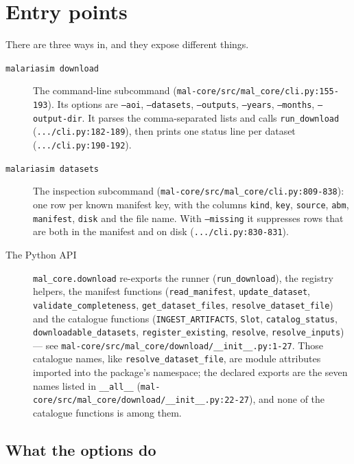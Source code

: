 \documentclass[11pt,a4paper]{article}
\newcommand{\code}[1]{\texttt{#1}}
\begin{document}
\section{Entry points}
\label{sec:entry}

There are three ways in, and they expose different things.

\begin{description}
\item[\code{malariasim download}] The command-line subcommand
(\code{mal-core/src/mal\_core/cli.py:155-193}). Its options are \code{--aoi},
\code{--datasets}, \code{--outputs}, \code{--years}, \code{--months},
\code{--output-dir}. It parses the comma-separated lists and calls
\code{run\_download} (\code{.../cli.py:182-189}), then prints one status line
per dataset (\code{.../cli.py:190-192}).
\item[\code{malariasim datasets}] The inspection subcommand
(\code{mal-core/src/mal\_core/cli.py:809-838}): one row per known manifest
key, with the columns \code{kind}, \code{key}, \code{source}, \code{abm},
\code{manifest}, \code{disk} and the file name. With \code{--missing} it
suppresses rows that are both in the manifest and on disk
(\code{.../cli.py:830-831}).
\item[The Python API] \code{mal\_core.download} re-exports the runner
(\code{run\_download}), the registry helpers, the manifest functions
(\code{read\_manifest}, \code{update\_dataset}, \code{validate\_completeness},
\code{get\_dataset\_files}, \code{resolve\_dataset\_file}) and the catalogue
functions (\code{INGEST\_ARTIFACTS}, \code{Slot}, \code{catalog\_status},
\code{downloadable\_datasets}, \code{register\_existing}, \code{resolve},
\code{resolve\_inputs}) --- see
\code{mal-core/src/mal\_core/download/\_\_init\_\_.py:1-27}. Those catalogue
names, like \code{resolve\_dataset\_file}, are module attributes imported
into the package's namespace; the declared exports are the seven names listed
in \code{\_\_all\_\_}
(\code{mal-core/src/mal\_core/download/\_\_init\_\_.py:22-27}), and none of
the catalogue functions is among them.
\end{description}

\subsection{What the options do}
\end{document}
